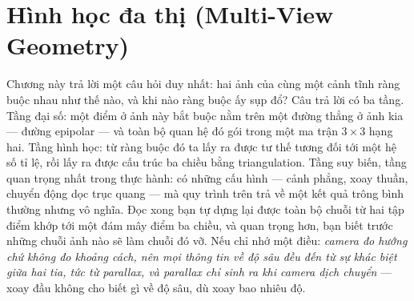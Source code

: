 \documentclass[../../vslam.tex]{subfiles}
\begin{document}
\chapter{Hình học đa thị (Multi-View Geometry)}

\begin{tomtat}
Chương này trả lời một câu hỏi duy nhất: hai ảnh của cùng một cảnh tĩnh ràng buộc nhau như thế nào, và khi nào ràng buộc ấy sụp đổ? Câu trả lời có ba tầng. Tầng đại số: một điểm ở ảnh này bắt buộc nằm trên một đường thẳng ở ảnh kia --- đường epipolar --- và toàn bộ quan hệ đó gói trong một ma trận \(3\times 3\) hạng hai. Tầng hình học: từ ràng buộc đó ta lấy ra được tư thế tương đối tới một hệ số tỉ lệ, rồi lấy ra được cấu trúc ba chiều bằng triangulation. Tầng suy biến, tầng quan trọng nhất trong thực hành: có những cấu hình --- cảnh phẳng, xoay thuần, chuyển động dọc trục quang --- mà quy trình trên trả về một kết quả trông bình thường nhưng vô nghĩa. Đọc xong bạn tự dựng lại được toàn bộ chuỗi từ hai tập điểm khớp tới một đám mây điểm ba chiều, và quan trọng hơn, bạn biết trước những chuỗi ảnh nào sẽ làm chuỗi đó vỡ. Nếu chỉ nhớ một điều: \emph{camera đo hướng chứ không đo khoảng cách, nên mọi thông tin về độ sâu đều đến từ sự khác biệt giữa hai tia, tức từ parallax, và parallax chỉ sinh ra khi camera dịch chuyển} --- xoay đầu không cho biết gì về độ sâu, dù xoay bao nhiêu độ.
\end{tomtat}
\end{document}
